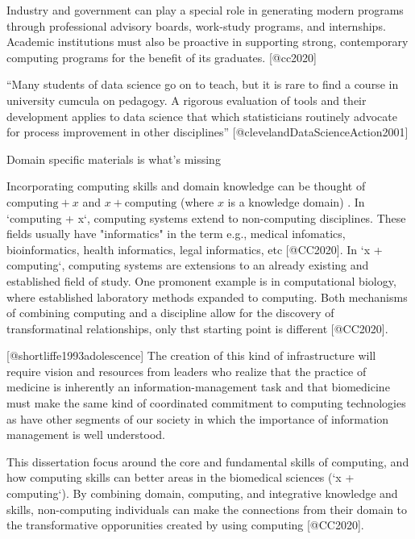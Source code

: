 \documentclass[010-intro.tex]{subfiles}
\begin{document}
Industry and government can play a special role in generating modern programs through
professional advisory boards, work-study programs, and internships.
Academic institutions must also be proactive in
supporting strong, contemporary computing programs for the benefit of its graduates. [@cc2020]

``Many students of data science
go on to teach, but it is rare to find a course in university cumcula on pedagogy.
A
rigorous evaluation
of tools and their development applies to data science that which statisticians routinely advocate for
process improvement in other disciplines'' [@clevelandDataScienceAction2001]

Domain specific materials is what's missing

Incorporating computing skills and domain knowledge can be thought of
$\text{computing} + x$ and $x + \text{computing}$ (where $x$ is a knowledge domain)
\cite{cc2020}.
In `computing + x`, computing systems extend to non-computing disciplines.
These fields usually have "informatics" in the term
e.g., medical infomatics, bioinformatics, health informatics, legal informatics, etc [@CC2020].
In `x + computing`,
computing systems are extensions to an already existing and established field of study.
One promonent example is in computational biology,
where established laboratory methods expanded to computing.
Both mechanisms of combining computing and a discipline allow for the discovery of transformatinal relationships,
only thst starting point is different [@CC2020].

[@shortliffe1993adolescence]
The creation of this kind of infrastructure will require vision and resources from leaders who realize that the practice of medicine is inherently an information-management task and that biomedicine must make the same kind of coordinated commitment to computing technologies as have other segments of our society in which the importance of information management is well understood.

This dissertation focus around the core and fundamental skills
of computing, and how computing skills can better areas in the biomedical sciences (`x + computing`).
By combining domain, computing, and integrative knowledge and skills,
non-computing individuals can make the connections from their domain to the transformative opporunities
created by using computing [@CC2020].
\end{document}
